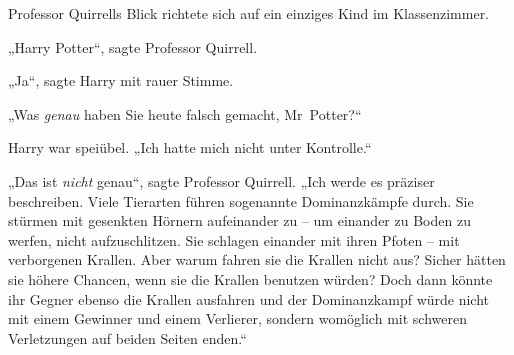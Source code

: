 Professor Quirrells Blick richtete sich auf ein einziges Kind im Klassenzimmer.

„Harry Potter“, sagte Professor Quirrell.

„Ja“, sagte Harry mit rauer Stimme.

„Was \emph{genau} haben Sie heute falsch gemacht, Mr~Potter?“

Harry war speiübel. „Ich hatte mich nicht unter Kontrolle.“

„Das ist \emph{nicht} genau“, sagte Professor Quirrell. „Ich werde es präziser beschreiben. Viele Tierarten führen sogenannte Dominanzkämpfe durch. Sie stürmen mit gesenkten Hörnern aufeinander zu – um einander zu Boden zu werfen, nicht aufzuschlitzen. Sie schlagen einander mit ihren Pfoten – mit verborgenen Krallen. Aber warum fahren sie die Krallen nicht aus? Sicher hätten sie höhere Chancen, wenn sie die Krallen benutzen würden? Doch dann könnte ihr Gegner ebenso die Krallen ausfahren und der Dominanzkampf würde nicht mit einem Gewinner und einem Verlierer, sondern womöglich mit schweren Verletzungen auf beiden Seiten enden.“

